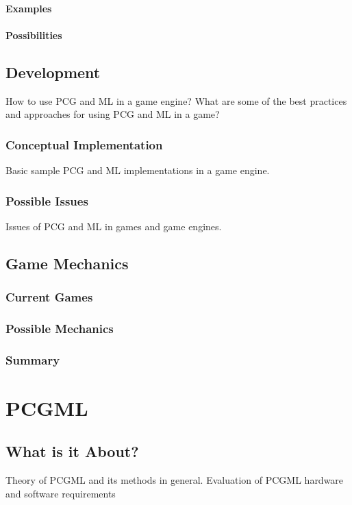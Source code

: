 \documentclass[MGS,Master,english]{twbook}%
\begin{document}
\subsubsection{Examples}
\subsubsection{Possibilities}

\section{Development}
How to use PCG and ML in a game engine? What are some of the best practices and approaches for using PCG and ML in a game?

\subsection{Conceptual Implementation}
Basic sample PCG and ML implementations in a game engine.

\subsection{Possible Issues}
Issues of PCG and ML in games and game engines.


\section{Game Mechanics}
\subsection{Current Games}
\subsection{Possible Mechanics}
\subsection{Summary}


%
%
\clearpage
\chapter{\acl{PCGML}}
\section{What is it About?}
Theory of PCGML and its methods in general.
Evaluation of PCGML hardware and software requirements
\end{document}
